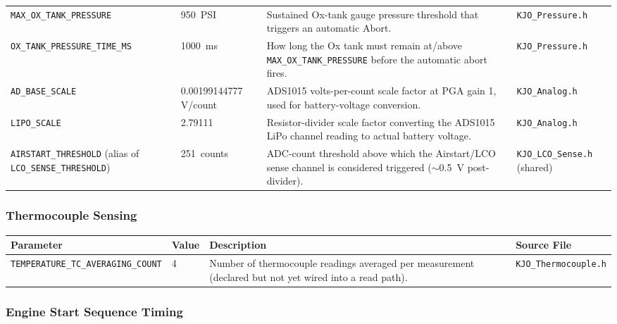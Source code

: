 ﻿\documentclass[11pt,letterpaper]{article}
\begin{document}
\begin{longtable}{@{}p{3.2cm}p{2.4cm}p{6.2cm}p{2.6cm}@{}}
\texttt{MAX\_\allowbreak OX\_\allowbreak TANK\_\allowbreak PRESSURE} & 950~PSI & Sustained Ox-tank gauge pressure threshold that triggers an automatic Abort. & \texttt{KJO\_\allowbreak Pressure.h} \\
\texttt{OX\_\allowbreak TANK\_\allowbreak PRESSURE\_\allowbreak TIME\_\allowbreak MS} & 1000~ms & How long the Ox tank must remain at/above \texttt{MAX\_\allowbreak OX\_\allowbreak TANK\_\allowbreak PRESSURE} before the automatic abort fires. & \texttt{KJO\_\allowbreak Pressure.h} \\
\texttt{AD\_\allowbreak BASE\_\allowbreak SCALE} & 0.00199144777 V/count & ADS1015 volts-per-count scale factor at PGA gain 1, used for battery-voltage conversion. & \texttt{KJO\_\allowbreak Analog.h} \\
\texttt{LIPO\_\allowbreak SCALE} & 2.79111 & Resistor-divider scale factor converting the ADS1015 LiPo channel reading to actual battery voltage. & \texttt{KJO\_\allowbreak Analog.h} \\
\texttt{AIRSTART\_\allowbreak THRESHOLD} (alias of \texttt{LCO\_\allowbreak SENSE\_\allowbreak THRESHOLD}) & 251~counts & ADC-count threshold above which the Airstart/LCO sense channel is considered triggered ($\sim$0.5~V post-divider). & \texttt{KJO\_\allowbreak LCO\_\allowbreak Sense.h} (shared) \\
\end{longtable}
\endgroup

\subsubsection*{Thermocouple Sensing}

\begingroup
\footnotesize
\begin{longtable}{@{}p{3.2cm}p{2.4cm}p{6.2cm}p{2.6cm}@{}}
\toprule
Parameter & Value & Description & Source File \\
\midrule
\texttt{TEMPERATURE\_\allowbreak TC\_\allowbreak AVERAGING\_\allowbreak COUNT} & 4 & Number of thermocouple readings averaged per measurement (declared but not yet wired into a read path). & \texttt{KJO\_\allowbreak Thermocouple.h} \\
\end{longtable}
\endgroup

\subsubsection*{Engine Start Sequence Timing}
\end{document}
